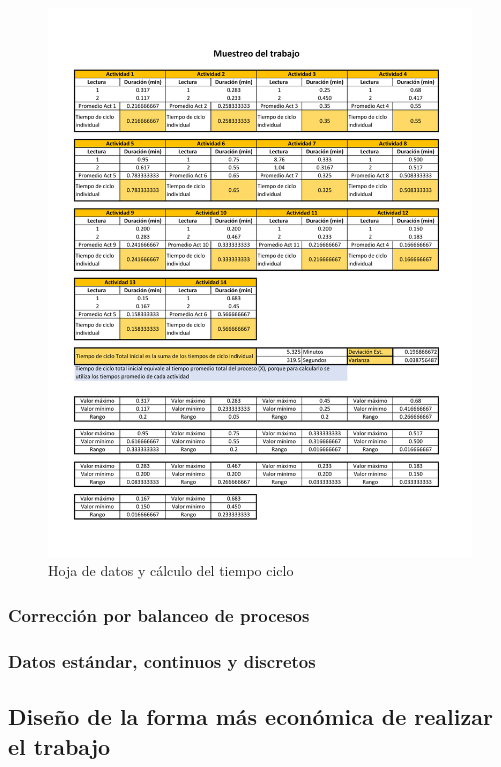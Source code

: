     \begin{figure}[H]
        \centering
        \includegraphics[trim = {10mm 10mm 10mm 10mm},clip,scale=0.4]{22/Img/tiempoCicloEnsamble.pdf}
        \caption{Hoja de datos y cálculo del tiempo ciclo}
        \label{fig:tiempoCiclo}
    \end{figure}
    
    
    
    
    
    \subsubsection{Corrección por balanceo de procesos}
    \subsubsection{Datos estándar, continuos y discretos}
    \subsection{Diseño de la forma más económica de realizar el trabajo}
    
